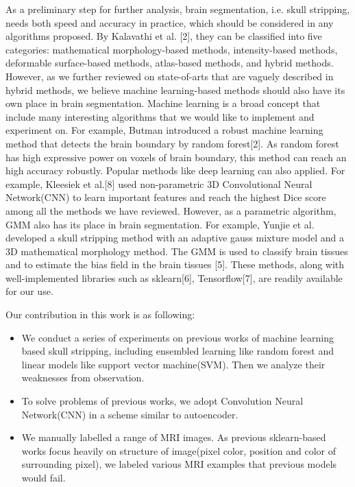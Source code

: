 \documentclass[conference]{IEEEtran}
\begin{document}
As a preliminary step for further analysis, brain segmentation, i.e. skull stripping, needs both speed and accuracy in practice, which should be considered in any algorithms proposed. By Kalavathi et al. [2], they can be classified into five categories: mathematical morphology-based methods, intensity-based methods, deformable surface-based methods, atlas-based methods, and hybrid methods. However, as we further reviewed on state-of-arts that are vaguely described in hybrid methods, we believe machine learning-based methods should also have its own place in brain segmentation. Machine learning is a broad concept that include many interesting algorithms that we would like to implement and experiment on. For example, Butman introduced a robust machine learning method that detects the brain boundary by random forest[2]. As random forest has high expressive power on voxels of brain boundary, this method can reach an high accuracy robustly. Popular methods like deep learning can also applied. For example, Kleesiek et al.[8] used non-parametric 3D Convolutional Neural Network(CNN) to learn important features and reach the highest Dice score among all the methods we have reviewed. However, as a parametric algorithm, GMM also has its place in brain segmentation. For example, Yunjie et al. developed a skull stripping method with an adaptive gauss mixture model and a 3D mathematical morphology method. The GMM is used to classify brain tissues and to estimate the bias field in the brain tissues [5]. These methods, along with well-implemented libraries such as sklearn[6], Tensorflow[7], are readily available for our use.

Our contribution in this work is as following:
\begin{itemize}
\item We conduct a series of experiments on previous works of machine learning based skull stripping, including ensembled learning like random forest and linear models like support vector machine(SVM). Then we analyze their weaknesses from observation. 
\item To solve problems of previous works, we adopt Convolution Neural Network(CNN) in a scheme similar to autoencoder. 
\item We manually labelled a range of MRI images. As previous sklearn-based works focus heavily on structure of image(pixel color, position and color of surrounding pixel), we labeled various MRI examples that previous models would fail. 
\end{itemize}
\end{document}
